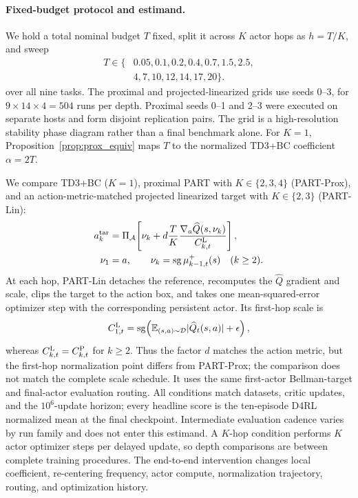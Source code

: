\documentclass[twoside]{article}
\newcommand{\sg}{\operatorname{sg}}
\begin{document}
\paragraph{Fixed-budget protocol and estimand.}
We hold a total nominal budget $T$ fixed, split it across $K$ actor hops as
$h=T/K$, and sweep
\begin{equation*}
\begin{split}
T\in\{&0.05,0.1,0.2,0.4,0.7,1.5,2.5,\\
      &4,7,10,12,14,17,20\}.
\end{split}
\end{equation*}
over all nine tasks. The proximal and projected-linearized grids use seeds 0--3, for
$9\times14\times4=504$ runs per depth.
Proximal seeds 0--1 and 2--3 were executed on separate hosts and form disjoint
replication pairs. The grid is a high-resolution stability phase diagram rather
than a final benchmark alone. For $K=1$, Proposition~\ref{prop:prox_equiv}
maps $T$ to the normalized TD3+BC coefficient $\alpha=2T$.

We compare TD3+BC ($K=1$), proximal PART with $K\in\{2,3,4\}$ (PART-Prox), and an
action-metric-matched projected linearized target with $K\in\{2,3\}$ (PART-Lin):
\begin{equation}
\begin{aligned}
 a_k^{\rm tar}
 &=\Pi_{\mathcal A}\!\left[
 \nu_k+d\frac{T}{K}\frac{\nabla_a\widehat Q(s,\nu_k)}{C_{k,t}^{\rm L}}\right],\\
 \nu_1&=a,\qquad
 \nu_k=\sg\mu_{k-1,t}^{+}(s)\quad(k\ge2).
\end{aligned}
 \label{eq:linearized_target}
\end{equation}
At each hop, PART-Lin detaches the reference, recomputes the $\widehat Q$
gradient and scale, clips the target to the action box, and takes one
mean-squared-error optimizer step with
the corresponding persistent actor. Its first-hop scale is
\begin{equation*}
C_{1,t}^{\rm L}=\sg\!\left(
\mathbb E_{(s,a)\sim\mathcal D}|\widehat Q_t(s,a)|+\epsilon\right),
\end{equation*}
whereas $C_{k,t}^{\rm L}=C_{k,t}^{\rm P}$ for $k\ge2$. Thus the factor $d$
matches the action metric, but the first-hop normalization point differs from
PART-Prox; the comparison does not match the complete scale schedule. It uses the same
first-actor Bellman-target and final-actor evaluation routing. All conditions match
datasets, critic updates, and the $10^6$-update horizon; every headline score is
the ten-episode D4RL normalized mean at the final checkpoint. Intermediate
evaluation cadence varies by run family and does not enter this estimand. A
$K$-hop condition performs $K$ actor optimizer steps per delayed update, so
depth comparisons are between complete training procedures. The end-to-end
intervention changes local coefficient, re-centering frequency, actor compute,
normalization trajectory, routing, and optimization history.
\end{document}
